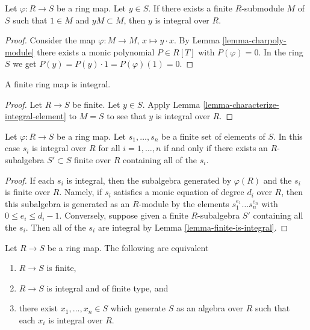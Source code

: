 \begin{lemma}
\label{lemma-characterize-integral-element}
Let $\varphi : R \to S$ be a ring map. Let $y \in S$. If there exists a
finite $R$-submodule $M$ of $S$ such that $1 \in M$ and $yM \subset M$,
then $y$ is integral over $R$.
\end{lemma}

\begin{proof}
Consider the map $\varphi : M \to M$, $x \mapsto y \cdot x$.
By Lemma \ref{lemma-charpoly-module} there exists a monic polynomial
$P \in R[T]$ with $P(\varphi) = 0$. In the ring $S$ we get
$P(y) = P(y) \cdot 1 = P(\varphi)(1) = 0$.
\end{proof}

\begin{lemma}
\label{lemma-finite-is-integral}
A finite ring map is integral.
\end{lemma}

\begin{proof}
Let $R \to S$ be finite. Let $y \in S$. Apply
Lemma \ref{lemma-characterize-integral-element}
to $M = S$ to see that $y$ is integral over $R$.
\end{proof}

\begin{lemma}
\label{lemma-characterize-integral}
Let $\varphi : R \to S$ be a ring map. Let $s_1, \ldots, s_n$
be a finite set of elements of $S$.
In this case $s_i$ is integral over $R$ for all $i = 1, \ldots, n$
if and only if
there exists an $R$-subalgebra $S' \subset S$ finite over $R$
containing all of the $s_i$.
\end{lemma}

\begin{proof}
If each $s_i$ is integral, then the subalgebra
generated by $\varphi(R)$ and the $s_i$ is finite
over $R$. Namely, if $s_i$ satisfies a monic equation
of degree $d_i$ over $R$, then this subalgebra is generated as an
$R$-module by the elements $s_1^{e_1} \ldots s_n^{e_n}$
with $0 \leq e_i \leq d_i - 1$.
Conversely, suppose given a finite $R$-subalgebra
$S'$ containing all the $s_i$. Then all of the
$s_i$ are integral by Lemma \ref{lemma-finite-is-integral}.
\end{proof}

\begin{lemma}
\label{lemma-characterize-finite-in-terms-of-integral}
Let $R \to S$ be a ring map. The following are equivalent
\begin{enumerate}
\item $R \to S$ is finite,
\item $R \to S$ is integral and of finite type, and
\item there exist $x_1, \ldots, x_n \in S$ which generate $S$ as an
algebra over $R$ such that each $x_i$ is integral over $R$.
\end{enumerate}
\end{lemma}


